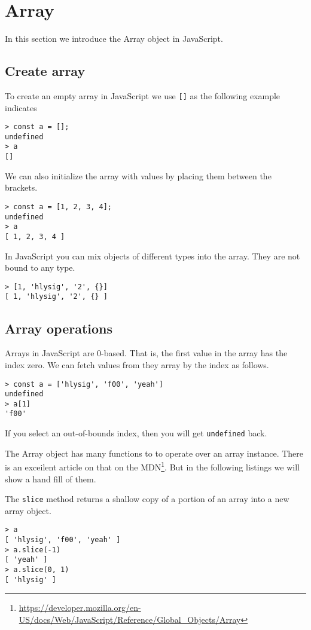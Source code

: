 \section{Array}\label{sec:arrays}
In this section we introduce the Array object in JavaScript.

\subsection{Create array}
To create an empty array in JavaScript we use \texttt{[]} as the following example indicates

\begin{lstlisting}
> const a = [];
undefined
> a
[]
\end{lstlisting}

We can also initialize the array with values by placing them between the brackets.

\begin{lstlisting}
> const a = [1, 2, 3, 4];
undefined
> a
[ 1, 2, 3, 4 ]
\end{lstlisting}

In JavaScript you can mix objects of different types into the array. They are not bound to any type.

\begin{lstlisting}
> [1, 'hlysig', '2', {}]
[ 1, 'hlysig', '2', {} ]
\end{lstlisting}

\subsection{Array operations}
Arrays in JavaScript are 0-based. That is, the first value in the array has the index zero. We can fetch values from they array by the index as follows.

\begin{lstlisting}
> const a = ['hlysig', 'f00', 'yeah']
undefined
> a[1]
'f00'
\end{lstlisting}

If you select an out-of-bounds index, then you will get \texttt{undefined} back.

The Array object has many functions to to operate over an array instance. There is an exceilent article on that on the MDN\footnote{\url{https://developer.mozilla.org/en-US/docs/Web/JavaScript/Reference/Global_Objects/Array}}. But in the following listings we will show a hand fill of them.

The \texttt{slice} method returns a shallow copy of a portion of an array into a new array object.
\begin{lstlisting}
> a
[ 'hlysig', 'f00', 'yeah' ]
> a.slice(-1)
[ 'yeah' ]
> a.slice(0, 1)
[ 'hlysig' ]
\end{lstlisting}

